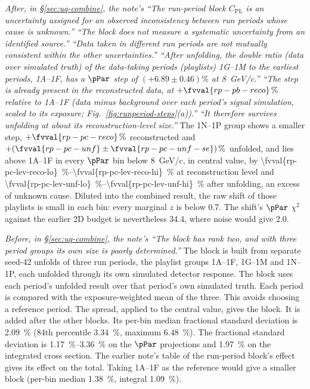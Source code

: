 \emph{After, in \S\ref{sec:uq-combine}, the note's ``The run-period block $C_{\mathrm{PL}}$ is an uncertainty assigned for an observed inconsistency between run periods whose cause is unknown.'' ``The block does not measure a systematic uncertainty from an identified source.'' ``Data taken in different run periods are not mutually consistent within the other uncertainties.'' ``After unfolding, the double ratio (data over simulated truth) of the data-taking periods (playlists) 1G--1M to the earliest periods, 1A--1F, has a $\pPar$ step of $(+6.89\pm0.46)\%$ at \SI{8}{GeV/c}.'' ``The step is already present in the reconstructed data, at $+\fvval{rp-pb-reco}\,\%$ relative to 1A--1F (data minus background over each period's signal simulation, scaled to its exposure; Fig.~\ref{fig:runperiod-steps}(a)).'' ``It therefore survives unfolding at about its reconstruction-level size.''}
The 1N--1P group shows a smaller step, $+\fvval{rp-pc-reco}\,\%$ reconstructed and $+(\fvval{rp-pc-unf}\pm\fvval{rp-pc-unf-se})\,\%$ unfolded, and lies above 1A--1F in every $\pPar$ bin below \SI{8}{GeV/c}, in central value, by \SIrange{\fvval{rp-pc-lev-reco-lo}}{\fvval{rp-pc-lev-reco-hi}}{\percent} at reconstruction level and \SIrange{\fvval{rp-pc-lev-unf-lo}}{\fvval{rp-pc-lev-unf-hi}}{\percent} after unfolding, an excess of unknown cause. Diluted into the combined result, the raw shift of those playlists is small in each bin: every marginal $z$ is below 0.7. The shift's $\pPar$ $\chi^{2}$ against the earlier 2D budget is nevertheless 34.4, where noise would give 2.0.

\emph{Before, in \S\ref{sec:uq-combine}, the note's ``The block has rank two, and with three period groups its own size is poorly determined.''}
The block is built from separate seed-42 unfolds of three run periods, the playlist groups 1A--1F, 1G--1M and 1N--1P, each unfolded through its own simulated detector response. The block uses each period's unfolded result over that period's own simulated truth. Each period is compared with the exposure-weighted mean of the three. This avoids choosing a reference period. The spread, applied to the central value, gives the block. It is added after the other blocks. Its per-bin median fractional standard deviation is \SI{2.09}{\percent} (84th percentile \SI{3.34}{\percent}, maximum \SI{6.48}{\percent}). The fractional standard deviation is \SIrange{1.17}{3.36}{\percent} on the $\pPar$ projections and \SI{1.97}{\percent} on the integrated cross section. The earlier note's table of the run-period block's effect gives its effect on the total. Taking 1A--1F as the reference would give a smaller block (per-bin median \SI{1.38}{\percent}, integral \SI{1.09}{\percent}).

